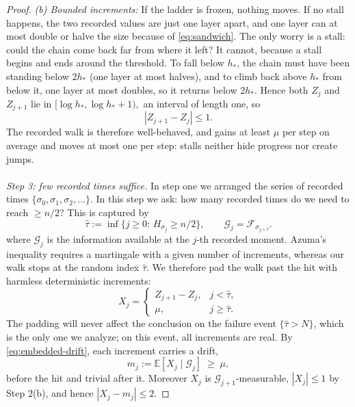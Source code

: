 \documentclass[
    aps,
    superscriptaddress,
    onecolumn,
    10pt,
    prx,
    nofootinbib
]{revtex4-2}
\theoremstyle{namedstatement}
\theoremstyle{plain}
\begin{document}
\begin{proof}
\smallskip\noindent\emph{(b) Bounded increments:}
If the ladder is frozen, nothing moves. If no stall happens, the two recorded values
are just one layer apart, and one layer can at most double or halve the size because of
\cref{eq:sandwich}. The only worry is a stall: could the chain come back far from
where it left? It cannot, because a stall begins and ends around the threshold. To
fall below $h_\ast$, the chain must have been standing below $2h_\ast$ (one layer at
most halves), and to climb back above $h_\ast$ from below it, one layer at most
doubles, so it returns below $2h_\ast$. Hence both $Z_j$ and $Z_{j+1}$ lie in
$[\log h_*,\log h_*+1),$
an interval of length one, so
\begin{equation}
|Z_{j+1}-Z_j|\le 1.
\end{equation}
The recorded walk is therefore well-behaved, and gains at least $\mu$ per step on average and moves at most
one per step: stalls neither hide progress nor create jumps.
\\
\\
\medskip\noindent\emph{Step 3: few recorded times suffice.}
In step one we arranged the series of recorded times $\{\sigma_0,\sigma_1,\sigma_2,\ldots\}$. In this step we ask: how many recorded times do we need to reach $\geq n/2$? This is captured by
\begin{equation}
  \widehat\tau:=\inf\{j\ge0:\,H_{\sigma_j}\ge n/2\},
  \qquad
  \mathcal G_j=\mathcal F_{\sigma_{j\wedge\widehat\tau}}.
\end{equation}
where $\mathcal G_j$ is the information available at the $j$-th recorded moment. Azuma's inequality requires a martingale with a given number of increments,
whereas our walk stops at the random index $\widehat\tau$. We therefore pad the walk
past the hit with harmless deterministic increments:
\begin{equation}
  X_j=\begin{cases} Z_{j+1}-Z_j, & j<\widehat\tau,\\ \mu, & j\ge\widehat\tau.\end{cases}
\end{equation}
The padding will never affect the conclusion on the failure event
$\{\widehat\tau>N\}$, which is the only one we analyze; on this event, all increments are real.
By \cref{eq:embedded-drift}, each increment carries a drift,
\begin{equation}
\label{eq:Drift_mu}
  m_j:=\mathbb E[X_j\mid\mathcal G_j]\;\ge\;\mu,
\end{equation}
before the hit and trivial after it. Moreover $X_j$ is $\mathcal G_{j+1}$-measurable, $|X_j|\le1$ by Step 2(b), and hence $|X_j-m_j|\le2$.

\end{proof}
\end{document}
